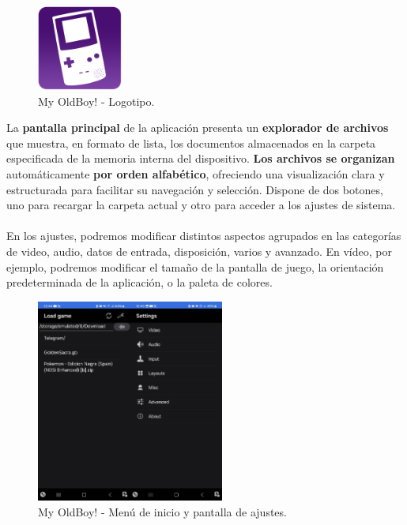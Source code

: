 \clearpage

\begin{figure}[h]
    \centering
    \includegraphics[width=0.25\textwidth]{include/images/myoldboy.png}
    \caption{My OldBoy! - Logotipo.}
    \label{figure:oldboylogo}
\end{figure}

La \textbf{pantalla principal} de la aplicación presenta un \textbf{explorador de archivos} que muestra, en formato de lista, los documentos almacenados en la carpeta especificada de la memoria interna del dispositivo. \textbf{Los archivos se organizan} automáticamente \textbf{por orden alfabético}, ofreciendo una visualización clara y estructurada para facilitar su navegación y selección. Dispone de dos botones, uno para recargar la carpeta actual y otro para acceder a los ajustes de sistema. 
\\\\
En los ajustes, podremos modificar distintos aspectos agrupados en las categorías de video, audio, datos de entrada, disposición, varios y avanzado. En vídeo, por ejemplo, podremos modificar el tamaño de la pantalla de juego, la orientación predeterminada de la aplicación, o la paleta de colores.

\begin{figure}[h]
    \centering
    \includegraphics[width=0.55\textwidth]{include/images/myoldboy2.jpg}
    \caption{My OldBoy! - Menú de inicio y pantalla de ajustes.}
    \label{figure:oldboy2}
\end{figure}

